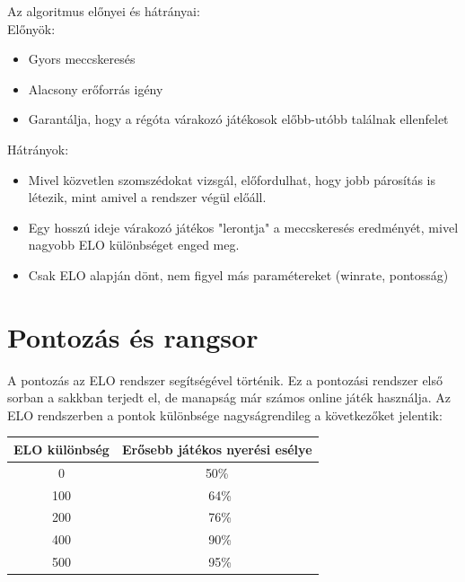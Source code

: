 \newpage
Az algoritmus előnyei és hátrányai:
\\
Előnyök:
\begin{itemize}
    \item Gyors meccskeresés
    \item Alacsony erőforrás igény
    \item Garantálja, hogy a régóta várakozó játékosok előbb-utóbb találnak ellenfelet
\end{itemize}
Hátrányok:
\begin{itemize}
    \item Mivel közvetlen szomszédokat vizsgál, előfordulhat, hogy jobb párosítás is létezik, mint amivel a rendszer végül előáll.
    \item Egy hosszú ideje várakozó játékos "lerontja" a meccskeresés eredményét, mivel nagyobb ELO különbséget enged meg.
    \item Csak ELO alapján dönt, nem figyel más paramétereket (winrate, pontosság)
\end{itemize}


\section{Pontozás és rangsor}
\label{sec:pontozas}
A pontozás az ELO rendszer segítségével történik. Ez a pontozási rendszer első sorban a sakkban terjedt el, de manapság már számos online játék használja. Az ELO rendszerben a pontok különbsége nagyságrendileg a következőket jelentik:
\\
\begin{center}
    \begin{tabular}{|c|c|}
         \hline
         ELO különbség & Erősebb játékos nyerési esélye \\
         \hline
         0 & 50\% \\
         \hline
         100 & ~64\% \\
         \hline
         200 & ~76\% \\
         \hline
         400 & ~90\% \\
         \hline
         500 & ~95\% \\
         \hline
    \end{tabular}    
\end{center}

